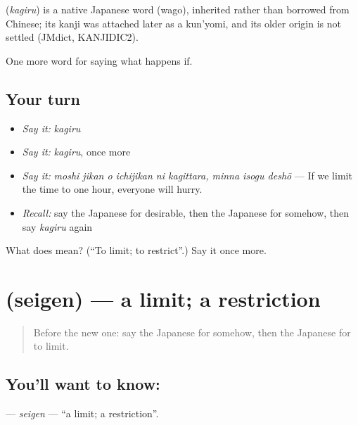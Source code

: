 \begin{cousinweb}
\textbf{} (\emph{kagiru}) is a native Japanese word (wago), inherited rather than borrowed from Chinese; its kanji was attached later as a kun'yomi, and its older origin is not settled (JMdict, KANJIDIC2).
\end{cousinweb}

\begin{grammarlens}[title={What you've built}]
One more word for saying what happens if.
\end{grammarlens}

\subsection*{Your turn}
\begin{itemize}
\raggedright
  \item \emph{Say it:} \emph{kagiru}
  \item \emph{Say it:} \emph{kagiru}, once more
  \item \emph{Say it:} \emph{moshi jikan o ichijikan ni kagittara, minna isogu deshō} — If we limit the time to one hour, everyone will hurry.
  \item \emph{Recall:} say the Japanese for desirable, then the Japanese for somehow, then say \emph{kagiru} again
\end{itemize}

\begin{tcolorbox}[breakable,colback=teal!4,colframe=teal!35!black,title={Before you move on}]
What does  mean? (\textquotedblleft{}To limit; to restrict\textquotedblright{}.) Say it once more.
\end{tcolorbox}
\section[\texorpdfstring{\ja{せいげん} (seigen)}{せいげん (seigen)}]{ (seigen) — a limit; a restriction}

\label{lesson:JA-C532-seigen}



\begin{quote}
Before the new one: say the Japanese for somehow, then the Japanese for to limit.
\end{quote}

\subsection*{You'll want to know: }
\textbf{} — \emph{seigen} — \textquotedblleft{}a limit; a restriction\textquotedblright{}.

